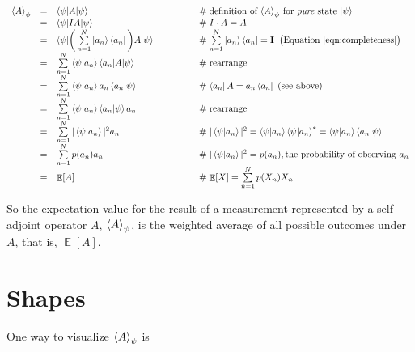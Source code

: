 \documentclass[11pt, oneside]{article}   	%
\DeclareMathOperator{\E}{\mathbb{E}}
\begin{document}
\begin{equation*}
\begin{array}{rcll}
\braket{A}_{\psi} 
&=& \braket{\psi |A | \psi}                             
    & \qquad\qquad \mathrel{\#} \text{definition of $\braket{A}_{\psi}$ for \emph{pure} state $\ket{\psi}$} \\
&=& \braket{\psi  | IA | \psi}                             
    & \qquad\qquad \mathrel{\#} I \cdot A = A \\
&=& \braket{\psi | \bigg (\sum\limits_{n = 1}^{N} \ket{a_n} \bra{a_n} \bigg ) A | \psi}                      
    & \qquad\qquad \mathrel{\#} \sum\limits_{n = 1}^{N} \ket{a_n} \bra{a_n} = \mathbf{I} \;\;  \text{\big (Equation \ref{eqn:completeness}} \big ) \\
&=& \sum\limits_{n = 1}^{N} \braket{\psi | a_n} \braket{a_n | A | \psi}                 
     & \qquad\qquad \mathrel{\#} \text{rearrange} \\
&=& \sum\limits_{n = 1}^{N} \braket{\psi | a_n} a_n   \braket{a_n | \psi}
    & \qquad\qquad \mathrel{\#}  \bra{a_n} A = a_n \bra{a_n} \text{ (see above)} \\
&=& \sum\limits_{n = 1}^{N} \braket{\psi | a_n}  \braket{a_n | \psi} a_n
    & \qquad\qquad \mathrel{\#}  \text{rearrange} \\
&=& \sum\limits_{n = 1}^{N} | \braket{\psi | a_n}|^2  a_n
    & \qquad\qquad \mathrel{\#} |\braket{\psi | a_n}|^2  = \braket{\psi | a_n}  \braket{\psi | a_n}^*  = \braket{\psi | a_n}  \braket{a_n | \psi}  \\
&=& \sum\limits_{n = 1}^{N} p(a_n)  a_n
    & \qquad\qquad \mathrel{\#}  |\braket{\psi | a_n}|^2 = p(a_n),  \text{the probability of observing $a_n$} \\
&=& \E [A]
    & \qquad\qquad \mathrel{\#}  \E [X] = \sum\limits_{n = 1}^{N} p(X_n) X_n
\end{array}
\end{equation*}

\bigskip
\noindent
So the expectation value for the result of a measurement represented by a self-adjoint operator $A$, $\braket{A}_{\psi}$,
 is the weighted average of all possible outcomes under $A$, that is, $\E [A]$.

\section{Shapes}
\label{sec:shapes}
One way to visualize $\braket{A}_{\psi}$ is
\end{document}
